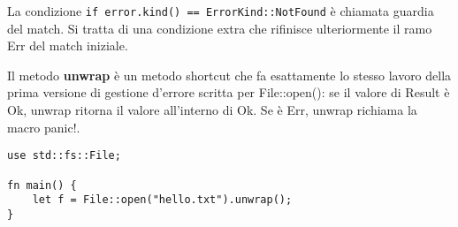 La condizione \texttt{if error.kind() == ErrorKind::NotFound} è chiamata
guardia del match. Si tratta di una condizione extra che rifinisce ulteriormente
il ramo Err del match iniziale.

Il metodo \textbf{unwrap} è un metodo shortcut che fa esattamente lo stesso lavoro
della prima versione di gestione d'errore scritta per File::open(): se il valore
di Result è Ok, unwrap ritorna il valore all'interno di Ok. Se è Err, unwrap richiama
la macro panic!.

\begin{lstlisting}
use std::fs::File;

fn main() {
    let f = File::open("hello.txt").unwrap();
}
\end{lstlisting}
